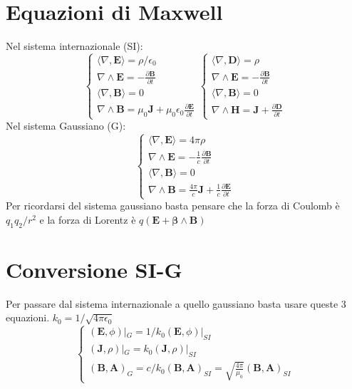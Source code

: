 \documentclass[11pt,a4paper]{report}
\newcommand{\vettore}[1]{\mathbf{#1}}
\newcommand{\pscal}[2]{\langle #1,#2\rangle}
\newcommand{\pvet}[2]{#1\wedge #2}
\begin{document}
	\section{Equazioni di Maxwell}
		Nel sistema internazionale (SI):
		\begin{equation}
			\begin{cases}
				\pscal \nabla{\vettore E}=\rho/\epsilon_0\\
				\pvet \nabla {\vettore E}=-\frac{\partial \vettore B}{\partial t}\\
				\pscal \nabla{\vettore B}=0\\
				\pvet \nabla {\vettore B}=\mu_0\vettore J+\mu_0\epsilon_0\frac{\partial \vettore E}{\partial t}
			\end{cases}
			\begin{cases}
				\pscal \nabla{\vettore D}=\rho\\
				\pvet \nabla {\vettore E}=-\frac{\partial \vettore B}{\partial t}\\
				\pscal \nabla{\vettore B}=0\\
				\pvet \nabla {\vettore H}=\vettore J+\frac{\partial \vettore D}{\partial t}
			\end{cases}
		\end{equation}
		Nel sistema Gaussiano (G):
		\begin{equation}
			\begin{cases}
				\pscal \nabla{\vettore E}=4\pi\rho\\
				\pvet \nabla {\vettore E}=-\frac 1 c \frac{\partial \vettore B}{\partial t}\\
				\pscal \nabla{\vettore B}=0\\
				\pvet \nabla {\vettore B}=\frac{4\pi}c \vettore J+\frac 1 c \frac{\partial \vettore E}{\partial t}
			\end{cases}
		\end{equation}
		Per ricordarsi del sistema gaussiano basta pensare che la forza di Coulomb è $q_1q_2/r^2$ e la forza di Lorentz è $q(\vettore E+\pvet{\vettore \beta}{\vettore B})$

	\section{Conversione SI-G}
		Per passare dal sistema internazionale a quello gaussiano basta usare queste 3 equazioni. $k_0=1/\sqrt{4\pi\epsilon_0}$
		\begin{equation}
			\begin{cases}
				(\vettore E,\phi)|_G=1/k_0(\vettore E,\phi)|_{SI}\\
				(\vettore J, \rho)|_G=k_0(\vettore J, \rho)|_{SI}\\
				(\vettore B,\vettore A)_G=c/k_0(\vettore B,\vettore A)_{SI}=
				\sqrt{\frac{4\pi}{\mu_0}}(\vettore B,\vettore A)_{SI}
			\end{cases}
		\end{equation}
\end{document}
